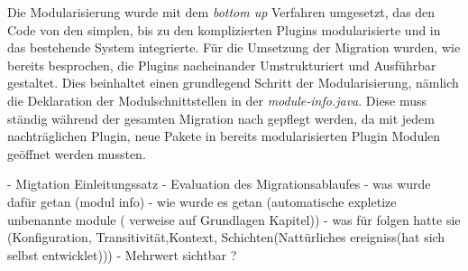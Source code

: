 Die Modularisierung wurde mit dem \textit{bottom up} Verfahren umgesetzt, das den Code von den simplen, bis zu den komplizierten Plugins modularisierte und in das bestehende System integrierte.  Für die Umsetzung der Migration wurden, wie bereits besprochen, die Plugins nacheinander Umstrukturiert und Ausführbar gestaltet. Dies beinhaltet einen grundlegend Schritt der Modularisierung, nämlich die Deklaration der Modulschnittstellen in der \textit{module-info.java}. Diese muss ständig während der gesamten Migration nach gepflegt werden, da mit jedem nachträglichen Plugin, neue Pakete in bereits modularisierten Plugin Modulen geöffnet werden mussten.


- Migtation Einleitungssatz 
- Evaluation des Migrationsablaufes
	- was wurde dafür getan (modul info)
	- wie wurde es getan (automatische expletize unbenannte module ( verweise auf Grundlagen Kapitel))
	- was für folgen hatte sie (Konfiguration, Transitivität,Kontext, Schichten(Nattürliches ereigniss(hat sich selbst entwicklet)))
	- Mehrwert  sichtbar ?




